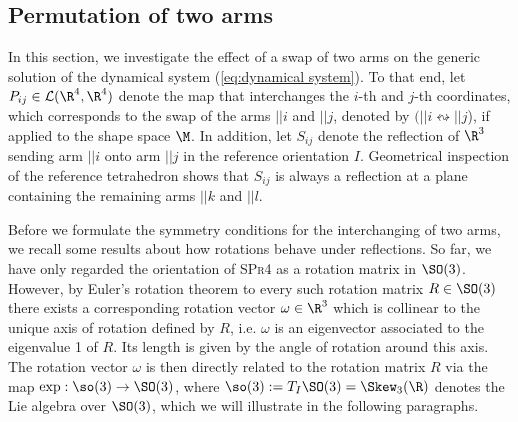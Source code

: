 \subsection{Permutation of two arms}
In this section, we investigate the effect of a swap of two arms on the generic solution of the dynamical system (\ref{eq:dynamical system}).
To that end, let $P_{ij} \in \mathcal{L}(\R^4, \R^4)$ denote the map that interchanges the $i$-th and $j$-th coordinates, which corresponds to the swap of the arms $||i$ and $||j$, denoted by $(||i\leftrightsquigarrow ||j$), if applied to the shape space $\M$. In addition, let $S_{ij}$ denote the reflection of $\R^3$ sending arm $||i$ onto arm $||j$ in the reference orientation $I$. Geometrical inspection of the reference tetrahedron shows that $S_{ij}$ is always a reflection at a plane containing the remaining arms $||k$ and $||l$.

Before we formulate the symmetry conditions for the interchanging of two arms, we recall some results about how rotations behave under reflections. So far, we have only regarded the orientation of \textsc{SPr4} as a rotation matrix in $\SO(3)$. However, by Euler's rotation theorem to every such rotation matrix $R \in \SO(3)$ there exists a corresponding rotation vector $\omega \in \R^3$ which is collinear to the unique axis of rotation defined by $R$, i.e. $\omega$ is an eigenvector associated to the eigenvalue 1 of $R$. Its length is given by the angle of rotation around this axis. The rotation vector $\omega$ is then directly related to the rotation matrix $R$ via the map $\exp: \so(3) \to \SO(3)$, where $\so(3) := T_I \SO(3) = \Skew_3(\R)$ denotes the Lie algebra over $\SO(3)$, which we will illustrate in the following paragraphs.


